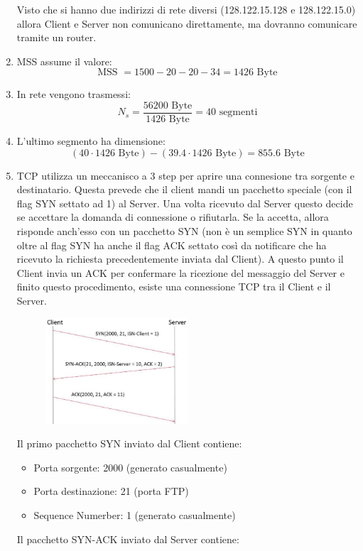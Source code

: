 \documentclass[10pt]{article}
\begin{document}
\begin{enumerate}
		Visto che si hanno due indirizzi di rete diversi (128.122.15.128 e 128.122.15.0) allora Client e Server non comunicano direttamente, ma dovranno comunicare tramite un router.
		\item MSS assume il valore: $$\textrm{MSS } = 1500 - 20 - 20 - 34 = 1426 \textrm{ Byte}$$
		\item In rete vengono trasmessi:
		$$ N_{s} =  \frac{56200 \textrm{ Byte}}{1426 \textrm{ Byte}} = 40 \textrm{ segmenti}$$
		\item L'ultimo segmento ha dimensione: $$(40 \cdot 1426 \textrm{ Byte}) - (39.4 \cdot 1426 \textrm{ Byte}) = 855.6 \textrm{ Byte}$$
		\newpage
		\item TCP utilizza un meccanisco a 3 step per aprire una connesione tra sorgente e destinatario. Questa prevede che il client mandi un pacchetto speciale (con il flag SYN settato ad 1) al Server. Una volta ricevuto dal Server questo decide se accettare la domanda di connessione o rifiutarla. 
		Se la accetta, allora risponde anch'esso con un pacchetto SYN (non è un semplice SYN in quanto oltre al flag SYN ha anche il flag ACK settato così da notificare che ha ricevuto la richiesta precedentemente inviata dal Client). A questo punto il Client invia un ACK per confermare la ricezione 
		del messaggio del Server e finito questo procedimento, esiste una connessione TCP tra il Client e il Server.
		\begin{figure}[H]
			\centering
			\includegraphics[width=0.5\textwidth]{ConnectionSetup_12062019}
		\end{figure}
		Il primo pacchetto SYN inviato dal Client contiene:
		\begin{itemize}
			\item Porta sorgente: 2000 (generato casualmente)
			\item Porta destinazione: 21 (porta FTP)
			\item Sequence Numerber: 1 (generato casualmente)
		\end{itemize}
		Il pacchetto SYN-ACK inviato dal Server contiene:
		\begin{itemize}

\end{itemize}
\end{enumerate}
\end{document}
